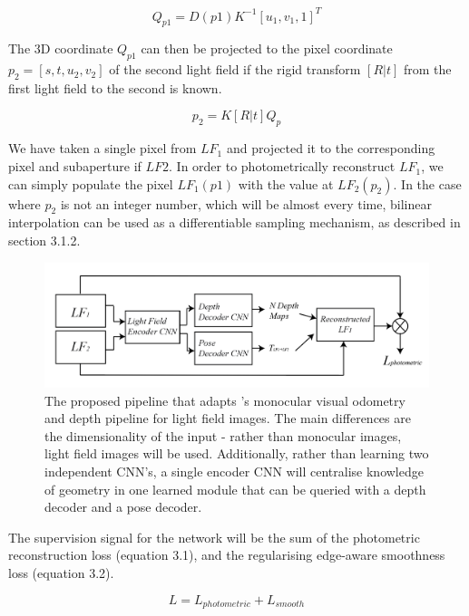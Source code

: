 \documentclass[openany]{book}
\begin{document}
\begin{equation}
    Q_{p1} = D(p1) K^{-1}[u_1,v_1,1]^T
\end{equation}

The 3D coordinate $Q_{p1}$ can then be projected to the pixel coordinate $p_2 = [s,t,u_2,v_2]$ of the second light field if the rigid transform $[R|t]$ from the first light field to the second is known.

\begin{equation}
    p_2 = K[R|t]Q_p
 \end{equation}

 We have taken a single pixel from $LF_1$ and projected it to the corresponding pixel and subaperture if $LF2$. In order to photometrically reconstruct $\hat{LF_1}$, we can simply populate the pixel $LF_1(p1)$ with the value at $LF_2(p_2)$. In the case where $p_2$ is not an integer number, which will be almost every time, bilinear interpolation can be used as a differentiable sampling mechanism, as described in section 3.1.2.

 \begin{figure}
    \centering 
    \includegraphics[width=5in]{images/lfpipeline.png}

    \caption{The proposed pipeline that adapts \cite{zhou2017unsupervised}'s monocular visual odometry and depth pipeline for light field images. The main differences are the dimensionality of the input - rather than monocular images, light field images will be used. Additionally, rather than learning two independent CNN's, a single encoder CNN will centralise knowledge of geometry in one learned module that can be queried with a depth decoder and a pose decoder.}
 \end{figure}

The supervision signal for the network will be the sum of the photometric reconstruction loss (equation 3.1), and the regularising edge-aware smoothness loss (equation 3.2). 

\begin{equation}
L = L_{photometric} + L_{smooth}
\end{equation}
\end{document}
